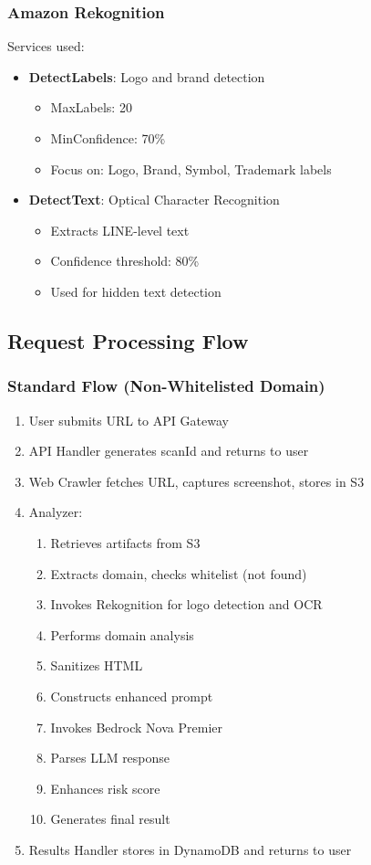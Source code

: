 \documentclass[conference]{IEEEtran}
\begin{document}
\subsubsection{Amazon Rekognition}

Services used:
\begin{itemize}
\item \textbf{DetectLabels}: Logo and brand detection
  \begin{itemize}
  \item MaxLabels: 20
  \item MinConfidence: 70\%
  \item Focus on: Logo, Brand, Symbol, Trademark labels
  \end{itemize}
\item \textbf{DetectText}: Optical Character Recognition
  \begin{itemize}
  \item Extracts LINE-level text
  \item Confidence threshold: 80\%
  \item Used for hidden text detection
  \end{itemize}
\end{itemize}

\subsection{Request Processing Flow}

\subsubsection{Standard Flow (Non-Whitelisted Domain)}

\begin{enumerate}
\item User submits URL to API Gateway
\item API Handler generates scanId and returns to user
\item Web Crawler fetches URL, captures screenshot, stores in S3
\item Analyzer:
  \begin{enumerate}
  \item Retrieves artifacts from S3
  \item Extracts domain, checks whitelist (not found)
  \item Invokes Rekognition for logo detection and OCR
  \item Performs domain analysis
  \item Sanitizes HTML
  \item Constructs enhanced prompt
  \item Invokes Bedrock Nova Premier
  \item Parses LLM response
  \item Enhances risk score
  \item Generates final result
  \end{enumerate}
\item Results Handler stores in DynamoDB and returns to user
\end{enumerate}
\end{document}
